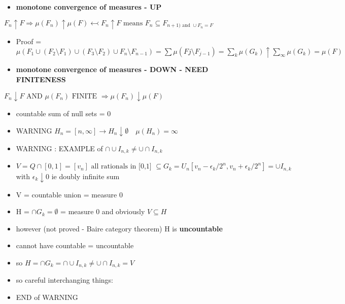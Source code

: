 \documentclass[10pt,landscape,a4paper]{article}
\newcommand{\mylp}{ \left ( }
\newcommand{\myrp}{ \right ) }
\begin{document}
\begin{multicols*}{3}
\begin{spacing}{0.5}
\begin{itemize}

\item \textbf{monotone convergence of measures - UP}
\end{itemize}
$
\boxed{F_n \uparrow F \Rightarrow \mu(F_n) \uparrow \mu(F)   \leftarrowtail F_n \uparrow F \text{ means } F_n \subseteq F_{n+1) \text{  and } \cup F_n = F} }$

\begin{itemize}

\item \colorbox{blue!10}{Proof} = $\mu(F_1 \cup \mylp F_2 \setminus F_1 \myrp \cup \mylp F_3 \setminus F_2 \myrp \cup F_n \setminus F_{n-1}  ) = \sum \mu (Fj \setminus F_{j-1}) = \sum_k \mu (G_k) \uparrow \sum_{\infty} \mu(G_k) = \mu(F)$


\item \textbf{monotone convergence of measures - DOWN - NEED FINITENESS}
\end{itemize}

\begin{mdframed}
$
F_n \downarrow F \text{  AND  } \mu(F_n) \text{  FINITE  } \Rightarrow \mu(F_n) \downarrow \mu(F)     $
\end{mdframed}

\begin{itemize} 
\item countable sum of null sets = 0
\item WARNING $ H_n = [ n,\infty ] \rightarrow H_n \downarrow \emptyset \quad \mu(H_n) = \infty$ 
\item WARNING : EXAMPLE of $\cap \cup I_{n,k} \neq \cup \cap I_{n,k}$  
\item  $ V = Q \cap [0,1] = [v_n] \text{ all rationals in [0,1] } \subseteq G_k = U_n [ v_n - \epsilon_k / 2^n , v_n + \epsilon_k / 2^n ] = \cup I_{n,k}$ with $\epsilon_k \downarrow 0 $ ie doubly infinite sum 
\item V = countable union = measure 0
\item H = $\cap G_k = \emptyset $ = measure 0 and obviously $ V \subseteq H$
\item however (not proved - Baire category theorem) H is \textbf{uncountable}
\item cannot have countable = uncountable 
\item so $ H = \cap G_k = \cap \cup I_{n,k} \neq \cup \cap I_{n,k} = V$
\item so careful interchanging things: 
\item END of WARNING 


\end{itemize}
\end{spacing}
\end{multicols*}
\end{document}
